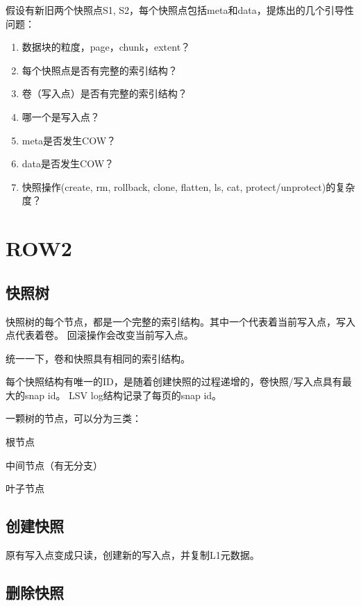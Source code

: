 \begin{tcolorbox}

假设有新旧两个快照点S1, S2，每个快照点包括meta和data，提炼出的几个引导性问题：

\begin{enumerate}
    \item 数据块的粒度，page，chunk，extent？
    \item 每个快照点是否有完整的索引结构？
    \item 卷（写入点）是否有完整的索引结构？
    \item 哪一个是写入点？
    \item meta是否发生COW？
    \item data是否发生COW？
    \item 快照操作(create, rm, rollback, clone, flatten, ls, cat, protect/unprotect)的复杂度？
\end{enumerate}

\end{tcolorbox}

\section{ROW2}

\subsection{快照树}

快照树的每个节点，都是一个完整的索引结构。其中一个代表着当前写入点，写入点代表着卷。
回滚操作会改变当前写入点。

统一一下，卷和快照具有相同的索引结构。

每个快照结构有唯一的ID，是随着创建快照的过程递增的，卷快照/写入点具有最大的snap id。
LSV log结构记录了每页的snap id。

一颗树的节点，可以分为三类：
\begin{compactenum}
\item 根节点
\item 中间节点（有无分支）
\item 叶子节点
\end{compactenum}

\subsection{创建快照}

原有写入点变成只读，创建新的写入点，并复制L1元数据。

\subsection{删除快照}

